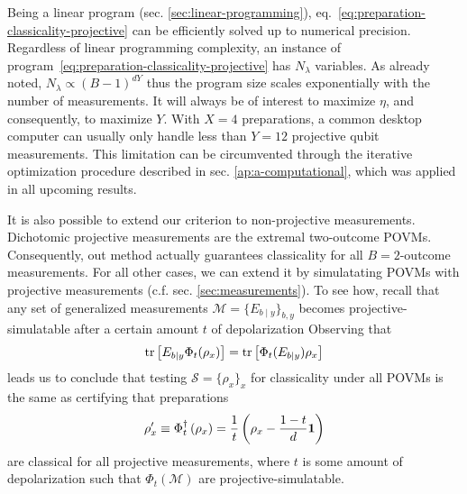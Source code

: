         Being a linear program (sec. \ref{sec:linear-programming}), eq.~\ref{eq:preparation-classicality-projective} can be efficiently solved up to numerical precision. Regardless of linear programming complexity, an instance of program~\eqref{eq:preparation-classicality-projective} has $N_\lambda$ variables. As already noted, $N_\lambda \propto (B-1)^{dY}$ thus the program size scales exponentially with the number of measurements. It will always be of interest to maximize $\eta$, and consequently, to maximize $Y$. With $X=4$ preparations, a common desktop computer can usually only handle less than $Y = 12$ projective qubit measurements. This limitation can be circumvented through the iterative optimization procedure described in sec. \ref{ap:a-computational}, which was applied in all upcoming results.

        It is also possible to extend our criterion to non-projective measurements. Dichotomic projective measurements are the extremal two-outcome POVMs. Consequently, out method actually guarantees classicality for all $B=2$-outcome measurements. For all other cases, we can extend it by simulatating POVMs with projective measurements (c.f. sec. \ref{sec:measurements}). To see how, recall that any set of generalized measurements $\mathcal{M} = \{ E_{b \mid y} \}_{b,y}$ becomes projective-simulatable after a certain amount $t$ of depolarization Observing that
        \begin{equation}
            \text{tr}\left[ E_{b \mid y} \Phi_t(\rho_x) \right] = \text{tr}\left[ \Phi_t(E_{b \mid y}) \rho_x \right]
        \end{equation}
        leads us to conclude that testing $\mathcal{S} = \{ \rho_x \}_x$ for classicality under all POVMs is the same as certifying that preparations
        \begin{equation}
            \rho^\prime_x \equiv \Phi_t^\dagger \left( \rho_x \right) = \frac{1}{t} \left( \rho_x - \frac{1-t}{d} \mathbf{1} \right)
        \end{equation}
        are classical for all projective measurements, where $t$ is some amount of depolarization such that $\Phi_t(\mathcal{M})$ are projective-simulatable.

